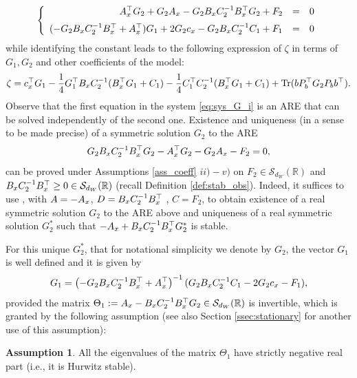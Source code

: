 \documentclass[a4paper,10pt]{article}
\newcommand{\RR}{\mathbb{R}}
\theoremstyle{definition}
\newtheorem{assumption}[theorem]{Assumption}
\theoremstyle{plain}
\numberwithin{equation}{section}
\begin{document}
\begin{equation}
\label{eq:sys_G_i}
\left\{
\begin{array}{rcl}
A_{\rm x}^\top G_2 + G_2 A_{\rm x} - G_2 B_{\rm x} C_2 ^{-1} B_{\rm x} ^\top G_2 + F_2 &=& 0 \vspace{0.2cm} \\
(-G_2 B_{\rm x} C_2^{-1} B_{\rm x} ^\top + A_{\rm x} ^\top )G_1 + 2G_2 c_{\rm x} - G_2 B_{\rm x} C_2 ^{-1} C_1 + F_1  &=& 0
\end{array}
\right.
\end{equation}
while identifying the constant leads to the following expression of $\zeta$ in terms of $G_1,G_2$ and other coefficients of the model:
\[
\zeta = c_{\rm x} ^\top G_1 - \frac{1}{4} G_1^\top B_{\rm x} C_2^{-1} (B_{\rm x} ^\top G_1 + C_1) - \frac{1}{4} C_1 ^\top C_2 ^{-1} (B_{\rm x} ^\top G_1 + C_1)  + \text{Tr}(b P_b^\top G_2 P_b b^\top).
\]
Observe that the first equation in the system \eqref{eq:sys_G_i} is an ARE that can be solved independently of the second one. 
Existence and uniqueness (in a sense to be made precise) of a symmetric solution $G_2$ to the ARE 
\begin{align*}
 G_2 B_{\rm x} C_2 ^{-1} B_{\rm x} ^\top G_2 - A_{\rm x}^\top G_2-  G_2 A_{\rm x}- F_2 = 0,
\end{align*}
can be proved under Assumptions \ref{ass_coeff} $ii)-v)$ on $F_2 \in \mathcal S_{d_W}(\RR)$ and $B_{\rm x} C_2^{-1} B_{\rm x}^\top \ge 0 \in \mathcal S_{d_W}(\RR)$ (recall Definition \ref{def:stab_obs}).
Indeed, it suffices to use \cite[Corollary 8.1.11]{Lancaster95}, with $A=-A_{\rm x}$, $D= B_{\rm x} C_2^{-1} B_{\rm x}^\top$ , $C=F_2$, to obtain existence of a real symmetric solution $G_2$ to the ARE above and uniqueness of a real symmetric solution $G_2^*$ such that $-A_{\rm x} + B_{\rm x} C_2^{-1} B_{\rm x}^\top G_2^* $ is stable.

For this unique $G_2^*$, that for notational simplicity we denote by $G_2$, the vector $G_1$ is well defined and it is given by 
\begin{equation}\label{eq:G1}
     G_1 = \left(- G_2 B_{\rm x} C_2 ^{-1} B_{\rm x} ^\top + A^\top_{\rm x} \right)^{-1}(G _2 B_{\rm x} C_2 ^{-1} C_1 - 2 G_2 c_{\rm x} - F_1),
\end{equation}
provided the matrix $\Theta_1 := A_{\rm x} - B_{\rm x} C_2^{-1} B_{\rm x} ^\top G_2 \in \mathcal S_{d_W}(\RR)$ is invertible, which is granted by the following assumption (see also Section \ref{ssec:stationary} for another use of this assumption):
\begin{assumption}\label{ass_Theta1}
	All the eigenvalues of the matrix $\Theta_1$ have strictly negative real part (i.e., it is Hurwitz stable).
\end{assumption}	
\end{document}
